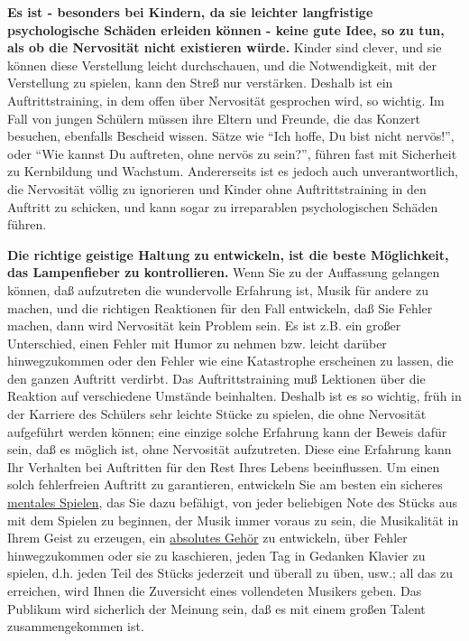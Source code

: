 \textbf{Es ist - besonders bei Kindern, da sie leichter langfristige psychologische Schäden erleiden können - keine gute Idee, so zu tun, als ob die Nervosität nicht existieren würde.}
Kinder sind clever, und sie können diese Verstellung leicht durchschauen, und die Notwendigkeit, mit der Verstellung zu spielen, kann den Streß nur verstärken.
Deshalb ist ein Auftrittstraining, in dem offen über Nervosität gesprochen wird, so wichtig.
Im Fall von jungen Schülern müssen ihre Eltern und Freunde, die das Konzert besuchen, ebenfalls Bescheid wissen.
Sätze wie \enquote{Ich hoffe, Du bist nicht nervös!}, oder \enquote{Wie kannst Du auftreten, ohne nervös zu sein?}, führen fast mit Sicherheit zu Kernbildung und Wachstum.
Andererseits ist es jedoch auch unverantwortlich, die Nervosität völlig zu ignorieren und Kinder ohne Auftrittstraining in den Auftritt zu schicken, und kann sogar zu irreparablen psychologischen Schäden führen.

\textbf{Die richtige geistige Haltung zu entwickeln, ist die beste Möglichkeit, das Lampenfieber zu kontrollieren.}
Wenn Sie zu der Auffassung gelangen können, daß aufzutreten die wundervolle Erfahrung ist, Musik für andere zu machen, und die richtigen Reaktionen für den Fall entwickeln, daß Sie Fehler machen, dann wird Nervosität kein Problem sein.
Es ist z.B. ein großer Unterschied, einen Fehler mit Humor zu nehmen bzw. leicht darüber hinwegzukommen oder den Fehler wie eine Katastrophe erscheinen zu lassen, die den ganzen Auftritt verdirbt.
Das Auftrittstraining muß Lektionen über die Reaktion auf verschiedene Umstände beinhalten.
Deshalb ist es so wichtig, früh in der Karriere des Schülers sehr leichte Stücke zu spielen, die ohne Nervosität aufgeführt werden können; eine einzige solche Erfahrung kann der Beweis dafür sein, daß es möglich ist, ohne Nervosität aufzutreten.
Diese eine Erfahrung kann Ihr Verhalten bei Auftritten für den Rest Ihres Lebens beeinflussen.
Um einen solch fehlerfreien Auftritt zu garantieren, entwickeln Sie am besten ein sicheres \hyperref[c1ii12mental]{mentales Spielen}, das Sie dazu befähigt, von jeder beliebigen Note des Stücks aus mit dem Spielen zu beginnen, der Musik immer voraus zu sein, die Musikalität in Ihrem Geist zu erzeugen, ein \hyperref[c1iii12]{absolutes Gehör} zu entwickeln, über Fehler hinwegzukommen oder sie zu kaschieren, jeden Tag in Gedanken Klavier zu spielen, d.h. jeden Teil des Stücks jederzeit und überall zu üben, usw.; all das zu erreichen, wird Ihnen die Zuversicht eines vollendeten Musikers geben.
Das Publikum wird sicherlich der Meinung sein, daß es mit einem großen Talent zusammengekommen ist.


